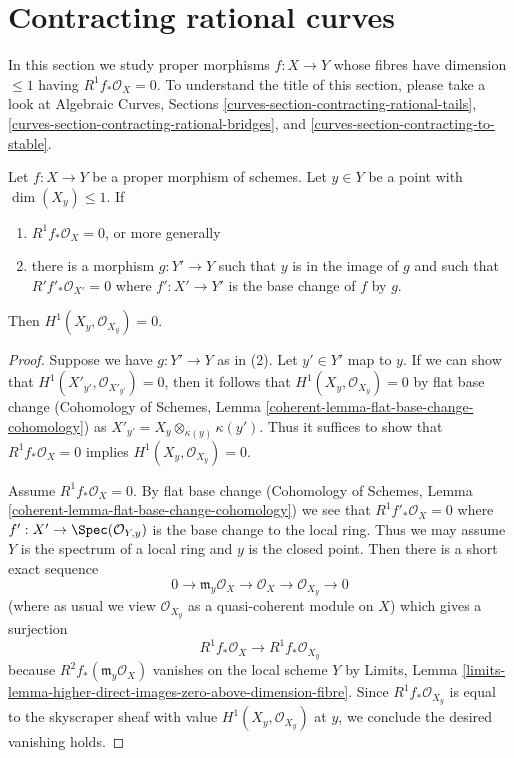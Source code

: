 \section{Contracting rational curves}
\label{section-contracting}

\noindent
In this section we study proper morphisms $f : X \to Y$ whose fibres
have dimension $\leq 1$ having $R^1f_*\mathcal{O}_X = 0$.
To understand the title of this section, please take a look at
Algebraic Curves, Sections
\ref{curves-section-contracting-rational-tails},
\ref{curves-section-contracting-rational-bridges}, and
\ref{curves-section-contracting-to-stable}.

\begin{lemma}
\label{lemma-check-h1-fibre-zero}
Let $f : X \to Y$ be a proper morphism of schemes. Let $y \in Y$
be a point with $\dim(X_y) \leq 1$. If
\begin{enumerate}
\item $R^1f_*\mathcal{O}_X = 0$, or more generally
\item there is a morphism $g : Y' \to Y$ such that $y$ is in the image
of $g$ and such that $R'f'_*\mathcal{O}_{X'} = 0$ where $f' : X' \to Y'$
is the base change of $f$ by $g$.
\end{enumerate}
Then $H^1(X_y, \mathcal{O}_{X_y}) = 0$.
\end{lemma}

\begin{proof}
Suppose we have $g : Y' \to Y$ as in (2).
Let $y' \in Y'$ map to $y$. If we can show that
$H^1(X'_{y'}, \mathcal{O}_{X'_{y'}}) = 0$, then it follows
that $H^1(X_y, \mathcal{O}_{X_y}) = 0$ by flat base change
(Cohomology of Schemes, Lemma
\ref{coherent-lemma-flat-base-change-cohomology})
as $X'_{y'} = X_y \otimes_{\kappa(y)} \kappa(y')$.
Thus it suffices to show that
$R^1f_*\mathcal{O}_X = 0$ implies $H^1(X_y, \mathcal{O}_{X_y}) = 0$.

\medskip\noindent
Assume $R^1f_*\mathcal{O}_X = 0$. By flat base change
(Cohomology of Schemes, Lemma
\ref{coherent-lemma-flat-base-change-cohomology})
we see that $R^1f'_*\mathcal{O}_X = 0$ where
$f' : X' \to \Spec(\mathcal{O}_{Y, y})$ is the base
change to the local ring. Thus we may assume $Y$ is the spectrum
of a local ring and $y$ is the closed point.
Then there is a short exact sequence
$$
0 \to \mathfrak m_y\mathcal{O}_X \to
\mathcal{O}_X \to \mathcal{O}_{X_y} \to 0
$$
(where as usual we view $\mathcal{O}_{X_y}$
as a quasi-coherent module on $X$)
which gives a surjection
$$
R^1f_*\mathcal{O}_X \to R^1f_*\mathcal{O}_{X_y}
$$
because $R^2f_*(\mathfrak m_y\mathcal{O}_X)$ vanishes
on the local scheme $Y$ by Limits, Lemma
\ref{limits-lemma-higher-direct-images-zero-above-dimension-fibre}.
Since $R^1f_*\mathcal{O}_{X_y}$ is equal to the skyscraper sheaf
with value $H^1(X_y, \mathcal{O}_{X_y})$ at $y$, we conclude
the desired vanishing holds.
\end{proof}

